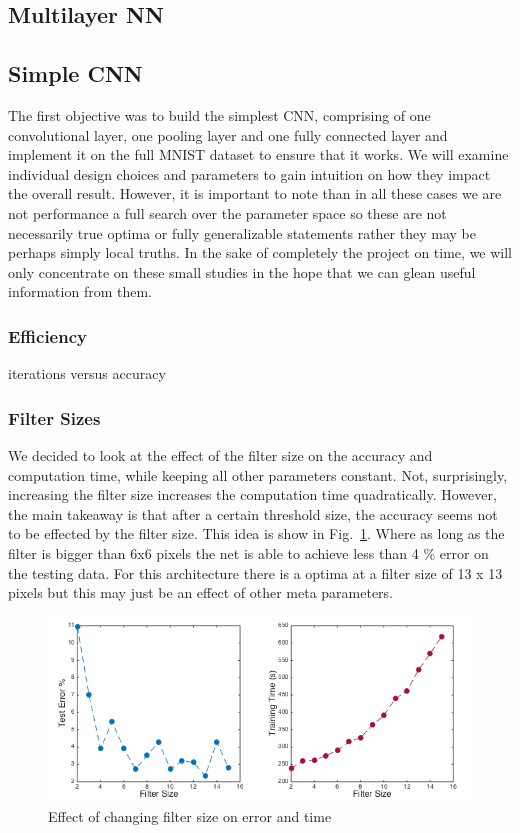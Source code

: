 \documentclass[12pt, twocolumn]{article}
\begin{document}
\subsection{Multilayer NN}
\subsection{Simple CNN}
The first objective was to build the simplest CNN, comprising of one convolutional layer, one pooling layer and one fully connected layer and implement it on the full MNIST dataset to ensure that it works. We will examine individual design choices and parameters to gain intuition on how they impact the overall result. However, it is important to note than in all these cases we are not performance a full search over the parameter space so these are not necessarily true optima or fully generalizable statements rather they may be perhaps simply local truths. In the sake of completely the project on time,  we will only concentrate on these small studies in the hope that we can glean useful information from them. 

\subsubsection{Efficiency}
iterations versus accuracy 

\subsubsection{Filter Sizes}

We decided to look at the effect of the filter size on the accuracy and computation time, while keeping all other parameters constant. Not, surprisingly, increasing the filter size increases the computation time quadratically. However, the main takeaway is that after a certain threshold size, the accuracy seems not to be effected by the filter size. This idea is show in Fig.~\ref{fig:filtsize}. Where as long as the filter is bigger than 6x6 pixels the net is able to achieve less than 4 $\%$ error on the testing data. For this architecture there is a optima at a filter size of 13 x 13 pixels but this may just be an effect of other meta parameters. 
\begin{figure}
\includegraphics[scale=.35]{filtersize.png}
\caption{Effect of changing filter size on error and time}
\label{fig:filtsize}

\end{figure}
\end{document}
